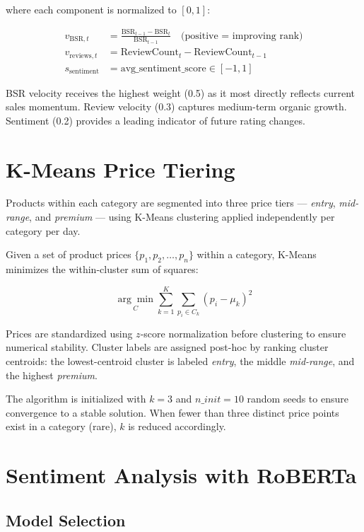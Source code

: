 where each component is normalized to $[0, 1]$:

\begin{align}
  v_{\text{BSR},t}     &= \frac{\text{BSR}_{t-1} - \text{BSR}_t}{\text{BSR}_{t-1}}
  \quad \text{(positive = improving rank)} \\
  v_{\text{reviews},t} &= \text{ReviewCount}_t - \text{ReviewCount}_{t-1} \\
  s_{\text{sentiment}} &= \text{avg\_sentiment\_score} \in [-1, 1]
\end{align}

BSR velocity receives the highest weight (0.5) as it most directly reflects current
sales momentum. Review velocity (0.3) captures medium-term organic growth. Sentiment
(0.2) provides a leading indicator of future rating changes.

\section{K-Means Price Tiering}

Products within each category are segmented into three price tiers — \textit{entry},
\textit{mid-range}, and \textit{premium} — using K-Means clustering applied
independently per category per day.

Given a set of product prices $\{p_1, p_2, \ldots, p_n\}$ within a category,
K-Means minimizes the within-cluster sum of squares:

\begin{equation}
  \underset{C}{\arg\min} \sum_{k=1}^{K} \sum_{p_i \in C_k} (p_i - \mu_k)^2
\end{equation}

Prices are standardized using $z$-score normalization before clustering to ensure
numerical stability. Cluster labels are assigned post-hoc by ranking cluster centroids:
the lowest-centroid cluster is labeled \textit{entry}, the middle \textit{mid-range},
and the highest \textit{premium}.

The algorithm is initialized with $k=3$ and $n\_init=10$ random seeds to ensure
convergence to a stable solution. When fewer than three distinct price points exist in
a category (rare), $k$ is reduced accordingly.

\section{Sentiment Analysis with RoBERTa}

\subsection{Model Selection}

